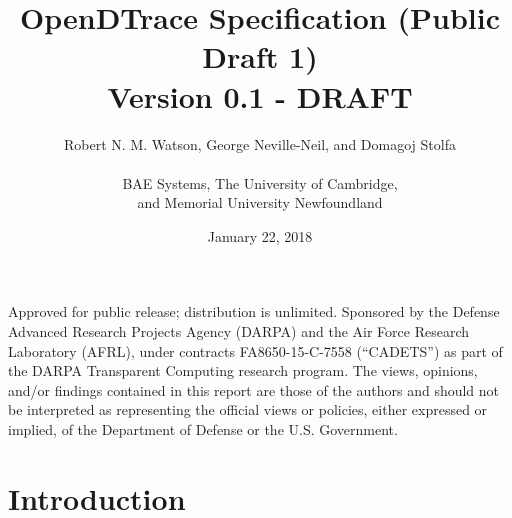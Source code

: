 


\title{OpenDTrace Specification (Public Draft 1)\\
  {\large Version 0.1 - DRAFT}
}

\date{January 22, 2018}

\author{
  Robert N. M. Watson, George Neville-Neil, and Domagoj Stolfa \\
  \\
  BAE Systems, The University of Cambridge, \\
    and Memorial University Newfoundland
}

\begin{minipage}[h]{\textwidth}
  \maketitle

  \vspace{2in}
  {\small
  Approved for public release; distribution is unlimited.
  Sponsored by the Defense Advanced Research Projects Agency (DARPA) and the
  Air Force Research Laboratory (AFRL), under contracts FA8650-15-C-7558
  (``CADETS'') as part of the DARPA Transparent Computing research program.
  The views, opinions, and/or findings contained in this report are those of the
  authors and should not be interpreted as representing the official views or
  policies, either expressed or implied, of the Department of Defense
  or the U.S. Government.}
\end{minipage}

\normalsize



\clearpage



\clearpage



\clearpage

\tableofcontents

\clearpage

\chapter{Introduction}
\label{chap:introduction}


